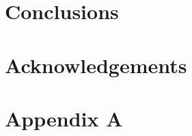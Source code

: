 \documentclass[useAMS,usenatbib]{mn2e}
\begin{document}






\section{Conclusions}



\section*{Acknowledgements} %
%
%
%

\appendix
\section*{Appendix A}\label{Stan_model}
\onecolumn

%
%
%
%
%
%
%
\end{document}
